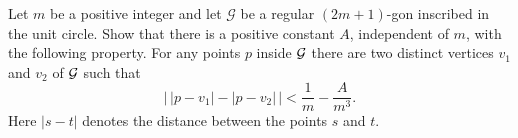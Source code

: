 Let $m$ be a positive integer and let $\mathcal{G}$ be a regular $(2m+1)$-gon
inscribed in the unit circle. Show that there is a positive constant $A$,
independent of $m$, with the following property. For any points $p$ inside
$\cal G$ there are two distinct vertices $v_1$ and $v_2$ of $\cal G$
such that
\[
\left|\,|p-v_1| - |p-v_2|\,\right| < \frac1{m} - \frac{A}{m^3}.
\]
Here $|s-t|$ denotes the distance between the points $s$ and $t$.

